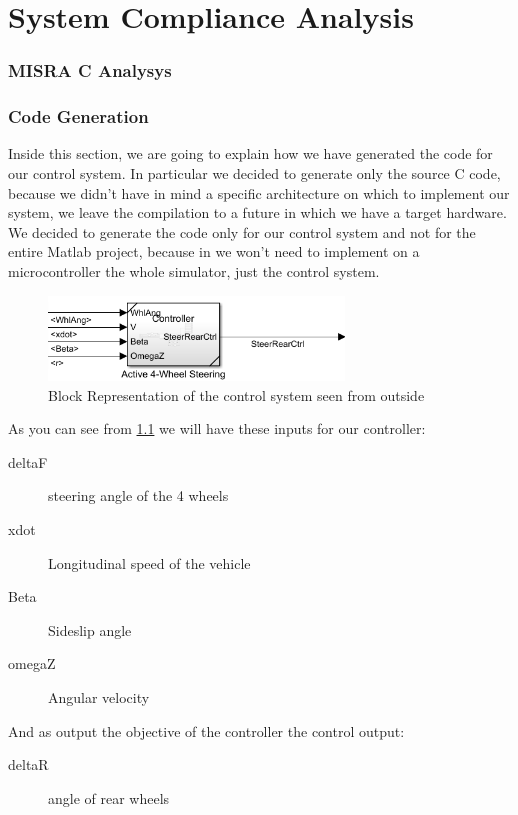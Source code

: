 
\chapter{System Compliance Analysis}

\subsection{MISRA C Analysys}

\subsection{Code Generation}
Inside this section, we are going to explain how we have generated the code for our control system. In particular we decided to generate only the source C code, because we didn't have in mind a specific architecture on which to implement our system, we leave the compilation to a future in which we have a target hardware. We decided to generate the code only for our control system and not for the entire Matlab project, because in we won't need to implement on a microcontroller the whole simulator, just the control system. 
\begin{figure} \label{Control Mask}
		\centering
		\includegraphics[width=0.7\textwidth]{Images/Simulator/ctrl-mask}
		\caption{Block Representation of the control system seen from outside}	
\end{figure}
As you can see from \ref{Control Mask} we will have these inputs for our controller:
\begin{description}
\item[deltaF] steering angle of the 4 wheels
\item[xdot] Longitudinal speed of the vehicle
\item[Beta] Sideslip angle
\item[omegaZ] Angular velocity
\end{description}
And as output the objective of the controller the control output:
\begin{description}
\item[deltaR] angle of rear wheels
\end{description}
